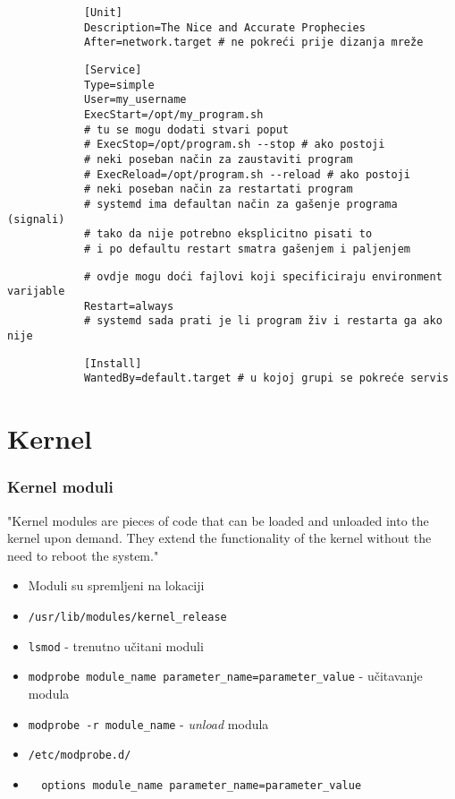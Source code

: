 \documentclass[t]{beamer}
\begin{document}
\begin{frame}[fragile]
	\footnotesize
	\begin{verbatim}
			[Unit]
			Description=The Nice and Accurate Prophecies
			After=network.target # ne pokreći prije dizanja mreže
	\end{verbatim}
	\begin{verbatim}
			[Service]
			Type=simple
			User=my_username		
			ExecStart=/opt/my_program.sh
			# tu se mogu dodati stvari poput
			# ExecStop=/opt/program.sh --stop # ako postoji 
			# neki poseban način za zaustaviti program
			# ExecReload=/opt/program.sh --reload # ako postoji 
			# neki poseban način za restartati program
			# systemd ima defaultan način za gašenje programa (signali) 
			# tako da nije potrebno eksplicitno pisati to
			# i po defaultu restart smatra gašenjem i paljenjem
	\end{verbatim}
	\begin{verbatim}
			# ovdje mogu doći fajlovi koji specificiraju environment varijable
			Restart=always
			# systemd sada prati je li program živ i restarta ga ako nije
	\end{verbatim}
	\begin{verbatim}
			[Install]
			WantedBy=default.target # u kojoj grupi se pokreće servis
	\end{verbatim}
\end{frame}



\section{Kernel}
\begin{frame}[fragile]
	\frametitle{Kernel moduli}
	"Kernel modules are pieces of code that can be loaded and unloaded into the kernel upon demand. They extend the functionality of the kernel without the need to reboot the system."
	\begin{itemize}
		\item Moduli su spremljeni na lokaciji
		\item[] \verb|/usr/lib/modules/kernel_release|
	\end{itemize}
	\begin{itemize}
		\item \texttt{lsmod} - trenutno učitani moduli
		\item \texttt{modprobe module\_name parameter\_name=parameter\_value} - učitavanje modula
		\item \texttt{modprobe -r module\_name} - \textit{unload} modula
	\end{itemize}
	\begin{itemize}
		\item[] \verb|/etc/modprobe.d/|
		\item[] \verb|  options module_name parameter_name=parameter_value|
	\end{itemize}
\end{frame}
\end{document}
